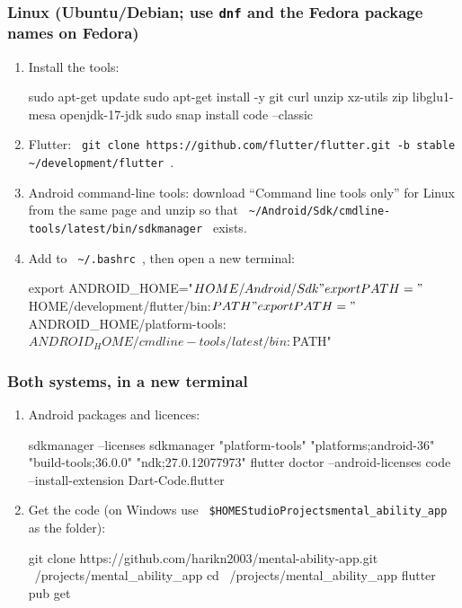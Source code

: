 \documentclass[12pt,a4paper]{article}
\newcommand{\codebs}{\symbol{92}\penalty50\relax}
\newcommand{\code}[1]{\texttt{\let\textbackslash\codebs\XeTeXinterchartokenstate=1 #1\XeTeXinterchartokenstate=0 }}
\begin{document}
\subsubsection*{Linux (Ubuntu/Debian; use \texttt{dnf} and the Fedora package names on Fedora)}
\begin{enumerate}
\item Install the tools:
\begin{shell}
sudo apt-get update
sudo apt-get install -y git curl unzip xz-utils zip libglu1-mesa openjdk-17-jdk
sudo snap install code --classic
\end{shell}
\item Flutter: \code{git clone https://github.com/flutter/flutter.git -b stable \textasciitilde{}/development/flutter}.
\item Android command-line tools: download ``Command line tools only'' for Linux from the same page and unzip so that \code{\textasciitilde{}/Android/Sdk/cmdline-tools/latest/bin/sdkmanager} exists.
\item Add to \code{\textasciitilde{}/.bashrc}, then open a new terminal:
\begin{shell}
export ANDROID_HOME="$HOME/Android/Sdk"
export PATH="$HOME/development/flutter/bin:$PATH"
export PATH="$ANDROID_HOME/platform-tools:$ANDROID_HOME/cmdline-tools/latest/bin:$PATH"
\end{shell}
\end{enumerate}

\subsubsection*{Both systems, in a new terminal}
\begin{enumerate}
\item Android packages and licences:
\begin{shell}
sdkmanager --licenses
sdkmanager "platform-tools" "platforms;android-36" "build-tools;36.0.0" "ndk;27.0.12077973"
flutter doctor --android-licenses
code --install-extension Dart-Code.flutter
\end{shell}
\item Get the code (on Windows use \code{\$HOME\textbackslash{}StudioProjects\textbackslash{}mental_ability_app} as the folder):
\begin{shell}
git clone https://github.com/harikn2003/mental-ability-app.git ~/projects/mental_ability_app
cd ~/projects/mental_ability_app
flutter pub get
\end{shell}
\end{enumerate}
\end{document}
